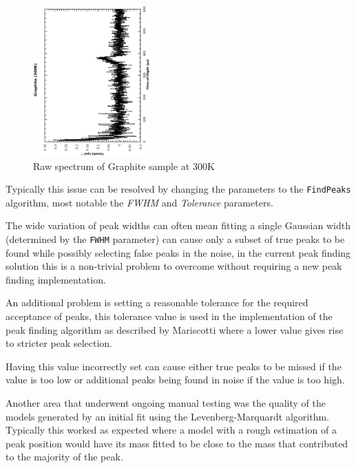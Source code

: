 \documentclass[a4paper]{article}
\begin{document}
\begin{figure}[h!]
  \centering
  \begin{turn}{-90}
    \includegraphics[width=0.4\textwidth]{graphics/peakfind_graphite.eps}
  \end{turn}
  \caption{Raw spectrum of Graphite sample at 300K}
  \label{fig:peakfind_graphite}
\end{figure}
\FloatBarrier

Typically this issue can be resolved by changing the parameters to the
\texttt{FindPeaks} algorithm, most notable the \textit{FWHM} and
\textit{Tolerance} parameters.

The wide variation of peak widths can often mean fitting a single Gaussian width
(determined by the \texttt{FWHM} parameter) can cause only a subset of true
peaks to be found while possibly selecting false peaks in the noise, in the
current peak finding solution this is a non-trivial problem to overcome without
requiring a new peak finding implementation.

An additional problem is setting a reasonable tolerance for the required
acceptance of peaks, this tolerance value is used in the implementation of the
peak finding algorithm as described by Mariscotti \cite{Mariscotti1967} where a
lower value gives rise to stricter peak selection.

Having this value incorrectly set can cause either true peaks to be missed if
the value is too low or additional peaks being found in noise if the value is
too high.

Another area that underwent ongoing manual testing was the quality of the
models generated by an initial fit using the Levenberg-Marquardt algorithm.
Typically this worked as expected where a model with a rough estimation of a
peak position would have its mass fitted to be close to the mass that
contributed to the majority of the peak.
\end{document}
